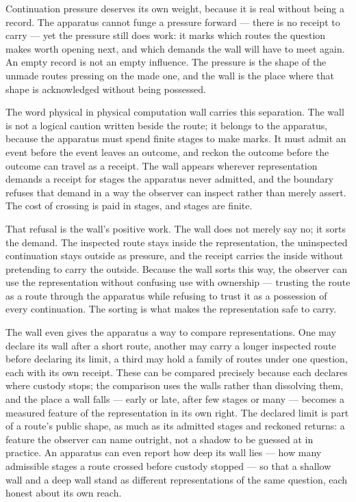Continuation pressure deserves its own weight, because it is real without being a record. The apparatus cannot funge a pressure forward --- there is no receipt to carry --- yet the pressure still does work: it marks which routes the question makes worth opening next, and which demands the wall will have to meet again. An empty record is not an empty influence. The pressure is the shape of the unmade routes pressing on the made one, and the wall is the place where that shape is acknowledged without being possessed.

The word physical in physical computation wall carries this separation. The wall is not a logical caution written beside the route; it belongs to the apparatus, because the apparatus must spend finite stages to make marks. It must admit an event before the event leaves an outcome, and reckon the outcome before the outcome can travel as a receipt. The wall appears wherever representation demands a receipt for stages the apparatus never admitted, and the boundary refuses that demand in a way the observer can inspect rather than merely assert. The cost of crossing is paid in stages, and stages are finite.

That refusal is the wall's positive work. The wall does not merely say no; it sorts the demand. The inspected route stays inside the representation, the uninspected continuation stays outside as pressure, and the receipt carries the inside without pretending to carry the outside. Because the wall sorts this way, the observer can use the representation without confusing use with ownership --- trusting the route as a route through the apparatus while refusing to trust it as a possession of every continuation. The sorting is what makes the representation safe to carry.

The wall even gives the apparatus a way to compare representations. One may declare its wall after a short route, another may carry a longer inspected route before declaring its limit, a third may hold a family of routes under one question, each with its own receipt. These can be compared precisely because each declares where custody stops; the comparison uses the walls rather than dissolving them, and the place a wall falls --- early or late, after few stages or many --- becomes a measured feature of the representation in its own right. The declared limit is part of a route's public shape, as much as its admitted stages and reckoned returns: a feature the observer can name outright, not a shadow to be guessed at in practice. An apparatus can even report how deep its wall lies --- how many admissible stages a route crossed before custody stopped --- so that a shallow wall and a deep wall stand as different representations of the same question, each honest about its own reach.

